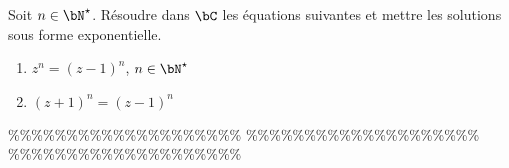 



\begin{exercice}  \;
Soit $n\in\bN^{\star}$. R\'esoudre dans $\bC$ les \'equations suivantes et mettre les solutions sous forme exponentielle.
\begin{enumerate}
\item $z^n=(z-1)^n$, $n\in\bN^{\star}$
\item $(z+1)^n=(z-1)^n$ 
\end{enumerate}
\end{exercice}


\%\%\%\%\%\%\%\%\%\%\%\%\%\%\%\%\%\%\%\%
\%\%\%\%\%\%\%\%\%\%\%\%\%\%\%\%\%\%\%\%
\%\%\%\%\%\%\%\%\%\%\%\%\%\%\%\%\%\%\%\%




